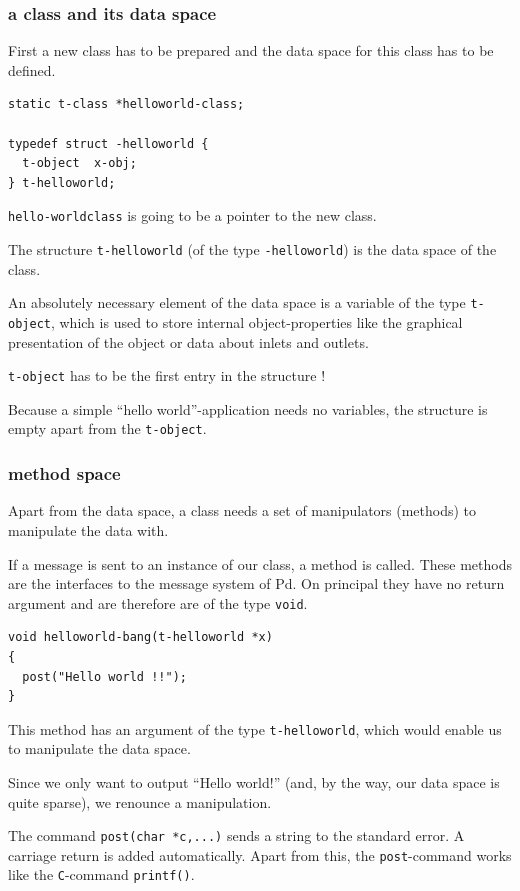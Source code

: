 \documentclass[draft]{ppgmus}
\begin{document}
\subsubsection{a class and its data space}
First a new class has to be prepared and the data space for this class has to be defined.

\begin{verbatim}
static t-class *helloworld-class;

typedef struct -helloworld {
  t-object  x-obj;
} t-helloworld;
\end{verbatim}

\verb+hello-worldclass+ is going to be a pointer to the new class.

The structure \verb+t-helloworld+ (of the type \verb+-helloworld+) is
the data space of the class.

An absolutely necessary element of the data space is a variable of the type
\verb+t-object+, which is used to store internal object-properties like
the graphical presentation of the object or data about inlets and outlets.

\verb+t-object+ has to be the first entry in the structure !

Because a simple ``hello world''-application needs no variables,
the structure is empty apart from the \verb+t-object+.


\subsubsection{method space}
Apart from the data space, a class needs a set of manipulators (methods) to
manipulate the data with.

If a message is sent to an instance of our class, a method is called.
These methods are the interfaces to the message system of Pd.
On principal they have no return argument and are therefore are of the
type \verb+void+.

\begin{verbatim}
void helloworld-bang(t-helloworld *x)
{
  post("Hello world !!");
}
\end{verbatim}


This method has an argument of the type \verb+t-helloworld+,
which would enable us to manipulate the data space.

Since we only want to output ``Hello world!''
(and, by the way, our data space is quite sparse),
we renounce a manipulation.

The command \verb+post(char *c,...)+ sends a string to the standard error.
A carriage return is added automatically.
Apart from this, the \verb+post+-command works like the {\tt C}-command \verb+printf()+.
\end{document}
